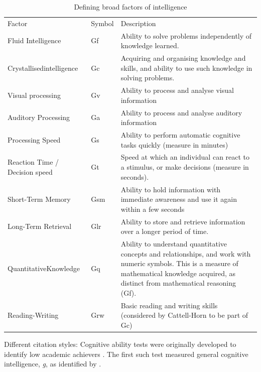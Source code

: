 \begin{table} [!t]\footnotesize    %
\centering
\captionsetup{font=small}
\captionsetup{aboveskip=-0.2\normalbaselineskip}
\caption[Defining broad factors of intelligence]{Defining broad factors of intelligence}
\label{IntFactors}

\begin{tabular}{p{3.5cm} l p{8cm} }\\   
\noalign{\smallskip}\hline\noalign{\smallskip}

Factor & Symbol & Description \\
\noalign{\smallskip}\hline\noalign{\smallskip}
Fluid Intelligence	&Gf 	&Ability to solve problems independently of knowledge learned.\\
\noalign{\smallskip}
Crystallised\newline intelligence&	Gc	&Acquiring and organising knowledge and skills, and ability to use such knowledge in solving problems.\\
\noalign{\smallskip}
Visual processing&	Gv&	Ability to process and analyse visual information\\
\noalign{\smallskip}
Auditory Processing	&Ga&	Ability to process and analyse auditory information\\
\noalign{\smallskip}
Processing Speed&	Gs&	Ability to perform automatic cognitive tasks quickly (measure in minutes)\\
\noalign{\smallskip}
Reaction Time / \newline Decision speed&	Gt&	Speed at which an individual can react to a stimulus, or make decisions (measure in seconds).\\
\noalign{\smallskip}
Short-Term Memory	&Gsm&	Ability to hold information with immediate awareness and use it again within a few seconds\\
\noalign{\smallskip}
Long-Term Retrieval&Glr&Ability to store and retrieve information over a longer period of time.\\
\noalign{\smallskip}
Quantitative\newline Knowledge&Gq	&Ability to understand quantitative concepts and relationships, and work with numeric symbols. This is a measure of mathematical knowledge acquired, as distinct from mathematical reasoning (Gf). \\
\noalign{\smallskip}
Reading-Writing	&Grw&	Basic reading and writing skills (considered by Cattell-Horn to be part of Gc)\\
\hline
\end{tabular}
\par\medskip
\end{table}	

Different citation styles: Cognitive ability tests were originally developed to identify low academic achievers \citep{Jensen1981, Munzert1980}. The first such test measured general cognitive intelligence, \emph{g}, as identified by \citet{Spearman1904, Spearman1927}. 



